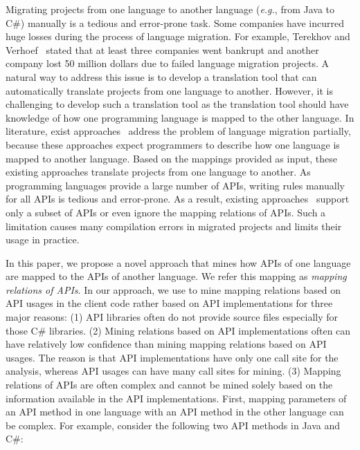 Migrating projects from one language to another language
(\emph{e.g.}, from Java to C\#) manually is a tedious and
error-prone task. Some companies have incurred huge losses during
the process of language migration. For example, Terekhov and
Verhoef~\cite{terekhov2000realities} stated that at least three
companies went bankrupt and another company lost 50 million dollars
due to failed language migration projects. A natural way to address
this issue is to develop a translation tool that can automatically
translate projects from one language to another. However, it is
challenging to develop such a translation tool as the translation
tool should have knowledge of how one programming language is mapped
to the other language. In literature, exist
approaches~\cite{mossienko2003automated, yasumatsu1995spice,
hainaut2008migration} address the problem of language migration
partially, because these approaches expect programmers to describe
how one language is mapped to another language. Based on the
mappings provided as input, these existing approaches translate
projects from one language to another. As programming languages
provide a large number of APIs, writing rules manually for all APIs
is tedious and error-prone. As a result, existing
approaches~\cite{mossienko2003automated,yasumatsu1995spice,hainaut2008migration}
support only a subset of APIs or even ignore the mapping relations
of APIs. Such a limitation causes many compilation errors in
migrated projects and limits their usage in practice.

In this paper, we propose a novel approach that mines how APIs of
one language are mapped to the APIs of another language. We refer
this mapping as \emph{mapping relations of APIs}. In our approach,
we use to mine mapping relations based on API usages in the client
code rather based on API implementations for three major reasons:
(1) API libraries often do not provide source files especially for
those C\# libraries. (2) Mining relations based on API
implementations often can have relatively low confidence than mining
mapping relations based on API usages. The reason is that API
implementations have only one call site for the analysis, whereas
API usages can have many call sites for mining. (3) Mapping
relations of APIs are often complex and cannot be mined solely based
on the information available in the API implementations. First,
mapping parameters of an API method in one language with an API
method in the other language can be complex. For example, consider
the following two API methods in Java and C\#:

